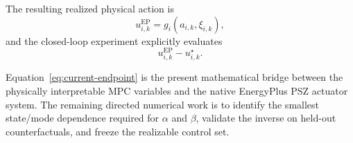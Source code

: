 \documentclass[11pt]{article}
\begin{document}
The resulting realized physical action is
\begin{equation}
u_{i,k}^{\mathrm{EP}}
=
g_i
\left(
a_{i,k},\xi_{i,k}
\right),
\end{equation}
and the closed-loop experiment explicitly evaluates
\begin{equation}
u_{i,k}^{\mathrm{EP}}
-
u_{i,k}^{\star}.
\end{equation}

Equation~\eqref{eq:current-endpoint} is the present mathematical bridge between
the physically interpretable MPC variables and the native EnergyPlus PSZ
actuator system.  The remaining directed numerical work is to identify the
smallest state/mode dependence required for $\alpha$ and $\beta$, validate the
inverse on held-out counterfactuals, and freeze the realizable control set.
\end{document}
